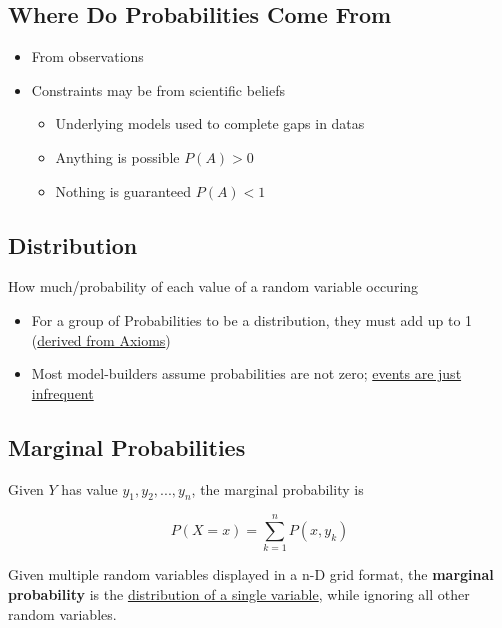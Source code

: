   \subsection{Where Do Probabilities Come From}

    \begin{itemize}
      \item From observations
      \item Constraints may be from scientific beliefs
      \begin{itemize}
        \item Underlying models used to complete gaps in datas
        \item Anything is possible $ P\left( A \right) > 0 $
        \item Nothing is guaranteed $ P\left( A \right) < 1 $
      \end{itemize}
    \end{itemize}

  \subsection{Distribution}

    How much/probability of each value of a random variable occuring

    \begin{itemize}
      \item For a group of Probabilities to be a distribution, they must add
      up to 1 (\ul{derived from Axioms})
      \item Most model-builders assume probabilities are not zero; \ul{
      events are just infrequent}
    \end{itemize}

  \subsection{Marginal Probabilities}

    Given $ Y $ has value $ y_{1}, y_{2}, ..., y_{n} $, the marginal
    probability is

    \begin{equation}
      P\left( X = x \right) = \sum_{k = 1}^{n} P\left( x, y_{k} \right)
    \end{equation}

    Given multiple random variables displayed in a n-D grid format,
    the \textbf{marginal probability} is the \ul{distribution of a single variable},
    while ignoring all other random variables.

